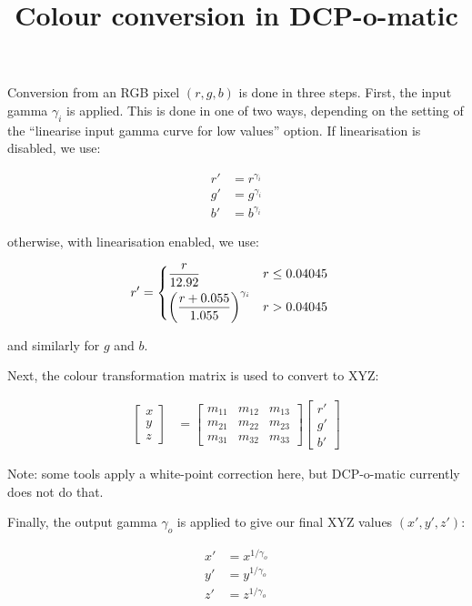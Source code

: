 \documentclass{article}
\title{Colour conversion in DCP-o-matic}
\author{}
\date{}
\begin{document}
\maketitle

Conversion from an RGB pixel $(r, g, b)$ is done in three steps.
First, the input gamma $\gamma_i$ is applied.  This is done in one of
two ways, depending on the setting of the ``linearise input gamma
curve for low values'' option.  If linearisation is disabled, we use:

\begin{align*}
r' &= r^{\gamma_i} \\
g' &= g^{\gamma_i} \\
b' &= b^{\gamma_i}
\end{align*}

otherwise, with linearisation enabled, we use:

\begin{align*}
r' &= \begin{dcases}
\frac{r}{12.92} & r \leq 0.04045 \\
\left(\frac{r + 0.055}{1.055}\right)^{\gamma_i} & r > 0.04045
\end{dcases}
\end{align*}

and similarly for $g$ and $b$.

Next, the colour transformation matrix is used to convert to XYZ:

\begin{align*}
\left[\begin{array}{c}
x \\
y \\
z
\end{array}\right] &=
\left[\begin{array}{ccc}
m_{11} & m_{12} & m_{13} \\
m_{21} & m_{22} & m_{23} \\
m_{31} & m_{32} & m_{33}
\end{array}\right]
\left[\begin{array}{c}
r' \\
g' \\
b'
\end{array}\right]
\end{align*}

Note: some tools apply a white-point correction here, but DCP-o-matic currently does not do that.

Finally, the output gamma $\gamma_o$ is applied to give our final XYZ values $(x', y', z')$:

\begin{align*}
x' &= x^{1/\gamma_o} \\
y' &= y^{1/\gamma_o} \\
z' &= z^{1/\gamma_o} \\
\end{align*}
\end{document}
